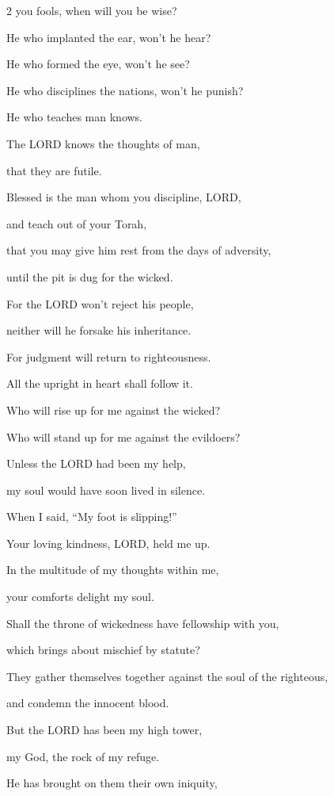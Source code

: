 \begin{multicols}{2}
	you fools, when will you be wise?
	
	
	\myverse{}He who implanted the ear, won’t he hear?
	
	He who formed the eye, won’t he see?
	
	
	\myverse{}He who disciplines the nations, won’t he punish?
	
	He who teaches man knows.
	
	
	\myverse{}The LORD knows the thoughts of man,
	
	that they are futile.
	
	
	\myverse{}Blessed is the man whom you discipline, LORD,
	
	and teach out of your Torah,
	
	
	\myverse{}that you may give him rest from the days of adversity,
	
	until the pit is dug for the wicked.
	
	
	\myverse{}For the LORD won’t reject his people,
	
	neither will he forsake his inheritance.
	
	
	\myverse{}For judgment will return to righteousness.
	
	All the upright in heart shall follow it.
	
	
	\myverse{}Who will rise up for me against the wicked?
	
	Who will stand up for me against the evildoers?
	
	
	\myverse{}Unless the LORD had been my help,
	
	my soul would have soon lived in silence.
	
	
	\myverse{}When I said, “My foot is slipping!”
	
	Your loving kindness, LORD, held me up.
	
	
	\myverse{}In the multitude of my thoughts within me,
	
	your comforts delight my soul.
	
	
	\myverse{}Shall the throne of wickedness have fellowship with you,
	
	which brings about mischief by statute?
	
	
	\myverse{}They gather themselves together against the soul of the righteous,
	
	and condemn the innocent blood.
	
	
	\myverse{}But the LORD has been my high tower,
	
	my God, the rock of my refuge.
	
	
	\myverse{}He has brought on them their own iniquity,
	

\end{multicols}
